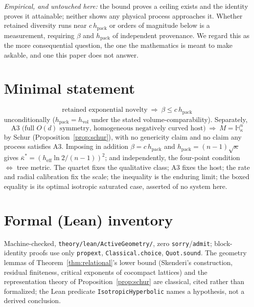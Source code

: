 \documentclass[11pt,reqno]{amsart}
\theoremstyle{plain}
\theoremstyle{definition}
\newcommand{\hpack}{h_{\mathrm{pack}}}
\newcommand{\hvol}{h_{\mathrm{vol}}}
\newcommand{\heff}{h_{\mathrm{eff}}}
\newcommand{\Hk}{\mathbb{H}^n_\kappa}
\begin{document}
\emph{Empirical, and untouched here:} the bound proves a ceiling exists and the identity proves it attainable; neither shows any physical process approaches it. Whether retained diversity runs near $c\,\hpack$ or orders of magnitude below is a measurement, requiring $\beta$ and $\hpack$ of independent provenance. We regard this as the more consequential question, the one the mathematics is meant to make askable, and one this paper does not answer.

\clearpage
\appendix
\section{Minimal statement}
\[
\boxed{\text{retained exponential novelty}\ \Longrightarrow\ \beta\le c\,\hpack}
\]
unconditionally ($\hpack=\hvol$ under the stated volume-comparability). Separately,
\[
\boxed{\text{A3 (full }O(d)\text{ symmetry, homogeneous negatively curved host)}\ \Longrightarrow\ M=\Hk}
\]
by Schur (Proposition~\ref{prop:schur}), with no genericity claim and no claim any process satisfies A3. Imposing in addition $\beta=c\,\hpack$ and $\hpack=(n-1)\sqrt\kappa$ gives $\bar\kappa^*=(\heff\ln2/(n-1))^2$; and independently, the four-point condition $\Leftrightarrow$ tree metric. The quartet fixes the qualitative class; A3 fixes the host; the rate and radial calibration fix the scale; the inequality is the enduring limit; the boxed equality is its optimal isotropic saturated case, asserted of no system here.

\section{Formal (Lean) inventory}
Machine-checked, \texttt{theory/lean/ActiveGeometry/}, zero \texttt{sorry}/\texttt{admit}; block-identity proofs use only \texttt{propext}, \texttt{Classical.choice}, \texttt{Quot.sound}. The geometry lemmas of Theorem~\ref{thm:relational}'s lower bound (Skenderi's construction, residual finiteness, critical exponents of cocompact lattices) and the representation theory of Proposition~\ref{prop:schur} are classical, cited rather than formalized; the Lean predicate \texttt{IsotropicHyperbolic} names a hypothesis, not a derived conclusion.
\end{document}
